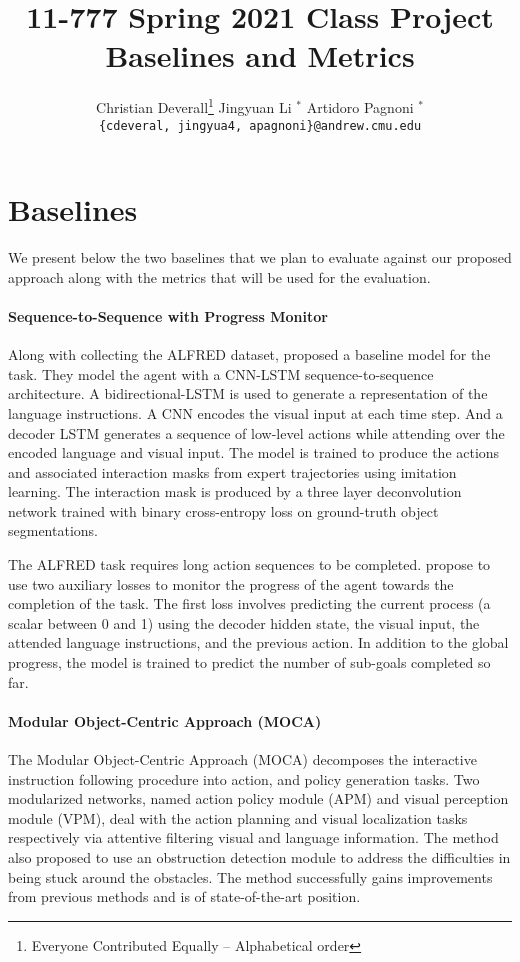 \documentclass[11pt,a4paper]{article}
\title{11-777 Spring 2021 Class Project\\
Baselines and Metrics}
\author{
  Christian Deverall\thanks{\hspace{4pt}Everyone Contributed Equally -- Alphabetical order} \hspace{2em} Jingyuan Li $^*$ \hspace{2em} Artidoro Pagnoni $^*$ \\
  \texttt{\{cdeveral, jingyua4, apagnoni\}@andrew.cmu.edu}
  }
\date{}
\begin{document}
\maketitle

\section{Baselines}
We present below the two baselines that we plan to evaluate against our proposed approach along with the metrics that will be used for the evaluation.

\paragraph{Sequence-to-Sequence with Progress Monitor}
Along with collecting the ALFRED dataset, \citet{ALFRED20} proposed a baseline model for the task. They model the agent with a CNN-LSTM sequence-to-sequence architecture. A bidirectional-LSTM is used to generate a representation of the language instructions. A CNN encodes the visual input at each time step. And a decoder LSTM generates a sequence of low-level actions while attending over the encoded language and visual input. The model is trained to produce the actions and associated interaction masks from expert trajectories using imitation learning. The interaction mask is produced by a three layer deconvolution network trained with binary cross-entropy loss on ground-truth object segmentations.

The ALFRED task requires long action sequences to be completed. \citet{ALFRED20} propose to use two auxiliary losses to monitor the progress of the agent towards the completion of the task. The first loss involves predicting the current process (a scalar between 0 and 1) using the decoder hidden state, the visual input, the attended language instructions, and the previous action. In addition to the global progress, the model is trained to predict the number of sub-goals completed so far. 

\paragraph{Modular Object-Centric Approach (MOCA)}The Modular Object-Centric Approach (MOCA) \citep{singh2020moca} decomposes the interactive instruction following procedure into action, and policy generation tasks. Two modularized networks, named action policy module (APM) and visual perception module (VPM), deal with the action planning and visual localization tasks respectively via attentive filtering visual and language information. The method also proposed to use an obstruction detection module to address the difficulties in being stuck around the obstacles. The method successfully gains improvements from previous methods and is of state-of-the-art position.
\end{document}
